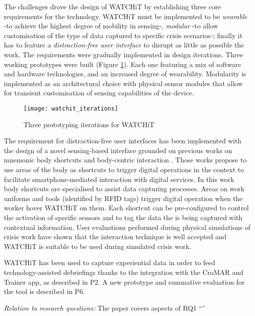The challenges drove the design of WATCHiT by establishing three core requirements for the technology. WATCHiT must be implemented to be \emph{wearable} -to achieve the highest degree of mobility in sensing-, \emph{modular} -to allow customisation of the type of data captured to specific crisis scenarios-; finally it has to feature a \emph{distraction-free user interface} to disrupt as little as possible the work. The requirements were gradually implemented in design iterations. Three working prototypes were built (Figure \ref{fig:watchit-prototypes}). Each one featuring a mix of software and hardware technologies, and an increased degree of wearability. Modularity is implemented as an architectural choice with physical sensor modules that allow for transient customisation of sensing capabilities of the device.

\begin{figure}
	[tbh] \centering 
	\texttt{[image: watchit\_iterations]} \caption{Three prototyping iterations for WATCHiT} \label{fig:watchit-prototypes} 
\end{figure}

The requirement for distraction-free user interfaces has been implemented with the design of a novel sensing-based interface grounded on previous works on mnemonic body shortcuts and body-centric interaction \autocites{Guerreiro:2008wt}{Chen:2012wk}. Those works propose to use areas of the body as shortcuts to trigger digital operations in the context to facilitate smartphone-mediated interaction with digital services. In this work body shortcuts are specialised to assist data capturing processes. Areas on work uniforms and tools (identified by RFID tags) trigger digital operation when the worker hover WATCHiT on them. Each shortcut can be pre-configured to control the activation of specific sensors and to tag the data the is being captured with contextual information. User evaluations performed during physical simulations of crisis work have shown that the interaction technique is well accepted and WATCHiT is suitable to be used during simulated crisis work.

WATCHiT has been used to capture experiential data in order to feed technology-assisted debriefings thanks to the integration with the CroMAR and Trainer app, as described in P2. A new prototype and summative evaluation for the tool is described in P6.

\emph{Relation to research questions:} The paper covers aspects of RQ1 ``\RQi''

